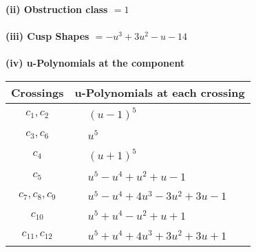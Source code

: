 \documentclass[1p]{elsarticle_modified}
\theoremstyle{definition}
\begin{document}
\flushleft \textbf{(ii) Obstruction class $= 1$}\\~\\
\flushleft \textbf{(iii) Cusp Shapes $= - u^3+3 u^2- u-14$}\\~\\
\newpage\renewcommand{\arraystretch}{1}
\flushleft \textbf{(iv) u-Polynomials at the component}\newline \\
\begin{tabular}{m{50pt}|m{274pt}}
Crossings & \hspace{64pt}u-Polynomials at each crossing \\
\hline $$\begin{aligned}c_{1},c_{2}\end{aligned}$$&$\begin{aligned}
&(u-1)^5
\end{aligned}$\\
\hline $$\begin{aligned}c_{3},c_{6}\end{aligned}$$&$\begin{aligned}
&u^5
\end{aligned}$\\
\hline $$\begin{aligned}c_{4}\end{aligned}$$&$\begin{aligned}
&(u+1)^5
\end{aligned}$\\
\hline $$\begin{aligned}c_{5}\end{aligned}$$&$\begin{aligned}
&u^5- u^4+u^2+u-1
\end{aligned}$\\
\hline $$\begin{aligned}c_{7},c_{8},c_{9}\end{aligned}$$&$\begin{aligned}
&u^5- u^4+4 u^3-3 u^2+3 u-1
\end{aligned}$\\
\hline $$\begin{aligned}c_{10}\end{aligned}$$&$\begin{aligned}
&u^5+u^4- u^2+u+1
\end{aligned}$\\
\hline $$\begin{aligned}c_{11},c_{12}\end{aligned}$$&$\begin{aligned}
&u^5+u^4+4 u^3+3 u^2+3 u+1
\end{aligned}$\\
\hline
\end{tabular}\\~\\
\end{document}
